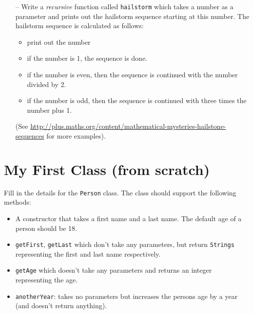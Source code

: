 \documentclass[11pt]{article}
\begin{document}
\begin{itemize}
%
%

\item [--] Write a \emph{recursive} function called \texttt{hailstorm} which takes a number as a parameter and prints out the hailstorm sequence starting at this number.  The hailstorm sequence is calculated as follows:

\begin{itemize}

\item print out the number

\item if the number is 1, the sequence is done.

\item if the number is even, then the sequence is continued with the number divided by 2.

\item if the number is odd, then the sequence is continued with three times the number plus 1.

\end{itemize}

(See \url{http://plus.maths.org/content/mathematical-mysteries-hailstone-sequences} for more examples).

\end{itemize}

\section{My First Class (from scratch)}

Fill in the details for the \texttt{Person} class.  The class should support the following methods:

\begin{itemize}

\item A constructor that takes a first name and a last name.  The default age of a person should be 18.

\item \texttt{getFirst}, \texttt{getLast} which don't take any parameters, but return \texttt{Strings} representing the first and last name respectively.

\item \texttt{getAge} which doesn't take any parameters and returns an integer representing the age.

\item \texttt{anotherYear}: takes no parameters but increases the persons age by a year (and doesn't return anything).

\end{itemize}
\end{document}

